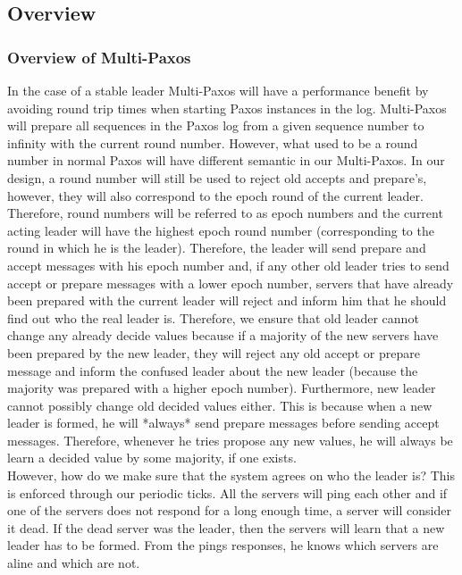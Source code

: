 \documentclass[a4paper]{article}
\begin{document}
\subsection{Overview}

\subsubsection{Overview of Multi-Paxos}

In the case of a stable leader Multi-Paxos will have a performance benefit by avoiding round trip times when starting Paxos instances in the log.
Multi-Paxos will prepare all sequences in the Paxos log from a given sequence number to infinity with the current round number.
However, what used to be a round number in normal Paxos will have different semantic in our Multi-Paxos.
In our design, a round number will still be used to reject old accepts and prepare's, however, they will also correspond to the epoch round of the current leader. 
Therefore, round numbers will be referred to as epoch numbers and the current acting leader will have the highest epoch round number (corresponding to the round in which he is the leader).
Therefore, the leader will send prepare and accept messages with his epoch number and, if any other old leader tries to send accept or prepare messages with a lower epoch number, servers that have already been prepared with the current leader will reject and inform him that he should find out who the real leader is.
Therefore, we ensure that old leader cannot change any already decide values because if a majority of the new servers have been prepared by the new leader, they will reject any old accept or prepare message and inform the confused leader about the new leader (because the majority was prepared with a higher epoch number).
Furthermore, new leader cannot possibly change old decided values either. 
This is because when a new leader is formed, he will *always* send prepare messages before sending accept messages.
Therefore, whenever he tries propose any new values, he will always be learn a decided value by some majority, if one exists.
\\
\indent However, how do we make sure that the system agrees on who the leader is? 
This is enforced through our periodic ticks.
All the servers will ping each other and if one of the servers does not respond for a long enough time, a server will consider it dead.
If the dead server was the leader, then the servers will learn that a new leader has to be formed.
From the pings responses, he knows which  servers are aline and which are not.
\end{document}
